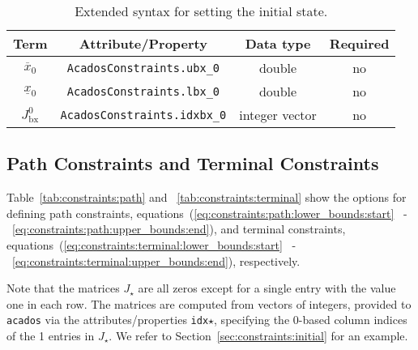 \documentclass[english]{article}
\newcommand{\code}[1]{\texttt{#1}}
\newcommand{\acados}{\texttt{acados}}
\newcommand{\ind}[1]{_{\textrm{#1}}}
\newcommand{\initial}{^{\textrm{0}}}
\newcommand{\optional}{no}
\begin{document}
\begin{table}[ht!]
    \centering
    \begin{tabular}{cccc}
        \toprule
        Term & Attribute/Property & Data type & Required \\ \midrule
        $ \overline{x}_0 $ & \code{AcadosConstraints.ubx\_0} & double & \optional \\
        $ \underline{x}_0 $ & \code{AcadosConstraints.lbx\_0} & double & \optional \\
        $ J\ind{bx}\initial$ & \code{AcadosConstraints.idxbx\_0} & integer vector & \optional \\
        \bottomrule
    \end{tabular}
    \caption{Extended syntax for setting the initial state.} \label{tab:constraints:extendedsyntax}
\end{table}
%
\subsection{Path Constraints and Terminal Constraints}\label{sec:constraints:path}
%
Table~\ref{tab:constraints:path} and ~\ref{tab:constraints:terminal} show the options for defining path constraints, equations~(\ref{eq:constraints:path:lower_bounds:start} ~-~\ref{eq:constraints:path:upper_bounds:end}), and terminal constraints, equations~(\ref{eq:constraints:terminal:lower_bounds:start} ~-~\ref{eq:constraints:terminal:upper_bounds:end}), respectively.

Note that the matrices $J_{\star}$ are all zeros except for a single entry with the value one in each row.
The matrices are computed from vectors of integers, provided to \acados{} via the attributes/properties \texttt{idx}$\star$, specifying the 0-based column indices of the 1 entries in $J_{\star}$.
We refer to Section~\ref{sec:constraints:initial} for an example.
\end{document}

